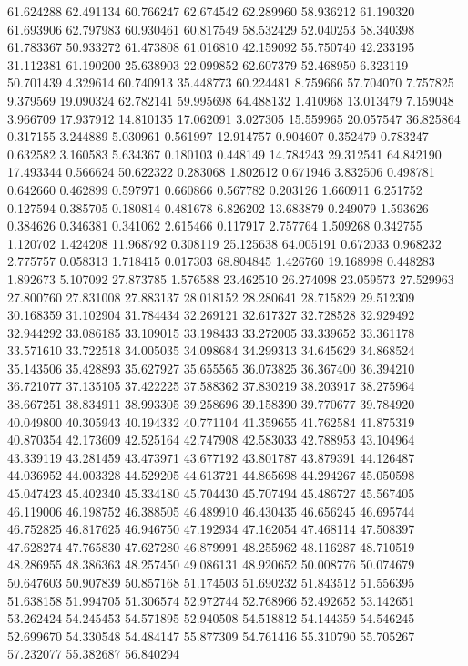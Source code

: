 61.624288
62.491134
60.766247
62.674542
62.289960
58.936212
61.190320
61.693906
62.797983
60.930461
60.817549
58.532429
52.040253
58.340398
61.783367
50.933272
61.473808
61.016810
42.159092
55.750740
42.233195
31.112381
61.190200
25.638903
22.099852
62.607379
52.468950
6.323119
50.701439
4.329614
60.740913
35.448773
60.224481
8.759666
57.704070
7.757825
9.379569
19.090324
62.782141
59.995698
64.488132
1.410968
13.013479
7.159048
3.966709
17.937912
14.810135
17.062091
3.027305
15.559965
20.057547
36.825864
0.317155
3.244889
5.030961
0.561997
12.914757
0.904607
0.352479
0.783247
0.632582
3.160583
5.634367
0.180103
0.448149
14.784243
29.312541
64.842190
17.493344
0.566624
50.622322
0.283068
1.802612
0.671946
3.832506
0.498781
0.642660
0.462899
0.597971
0.660866
0.567782
0.203126
1.660911
6.251752
0.127594
0.385705
0.180814
0.481678
6.826202
13.683879
0.249079
1.593626
0.384626
0.346381
0.341062
2.615466
0.117917
2.757764
1.509268
0.342755
1.120702
1.424208
11.968792
0.308119
25.125638
64.005191
0.672033
0.968232
2.775757
0.058313
1.718415
0.017303
68.804845
1.426760
19.168998
0.448283
1.892673
5.107092
27.873785
1.576588
23.462510
26.274098
23.059573
27.529963
27.800760
27.831008
27.883137
28.018152
28.280641
28.715829
29.512309
30.168359
31.102904
31.784434
32.269121
32.617327
32.728528
32.929492
32.944292
33.086185
33.109015
33.198433
33.272005
33.339652
33.361178
33.571610
33.722518
34.005035
34.098684
34.299313
34.645629
34.868524
35.143506
35.428893
35.627927
35.655565
36.073825
36.367400
36.394210
36.721077
37.135105
37.422225
37.588362
37.830219
38.203917
38.275964
38.667251
38.834911
38.993305
39.258696
39.158390
39.770677
39.784920
40.049800
40.305943
40.194332
40.771104
41.359655
41.762584
41.875319
40.870354
42.173609
42.525164
42.747908
42.583033
42.788953
43.104964
43.339119
43.281459
43.473971
43.677192
43.801787
43.879391
44.126487
44.036952
44.003328
44.529205
44.613721
44.865698
44.294267
45.050598
45.047423
45.402340
45.334180
45.704430
45.707494
45.486727
45.567405
46.119006
46.198752
46.388505
46.489910
46.430435
46.656245
46.695744
46.752825
46.817625
46.946750
47.192934
47.162054
47.468114
47.508397
47.628274
47.765830
47.627280
46.879991
48.255962
48.116287
48.710519
48.286955
48.386363
48.257450
49.086131
48.920652
50.008776
50.074679
50.647603
50.907839
50.857168
51.174503
51.690232
51.843512
51.556395
51.638158
51.994705
51.306574
52.972744
52.768966
52.492652
53.142651
53.262424
54.245453
54.571895
52.940508
54.518812
54.144359
54.546245
52.699670
54.330548
54.484147
55.877309
54.761416
55.310790
55.705267
57.232077
55.382687
56.840294
